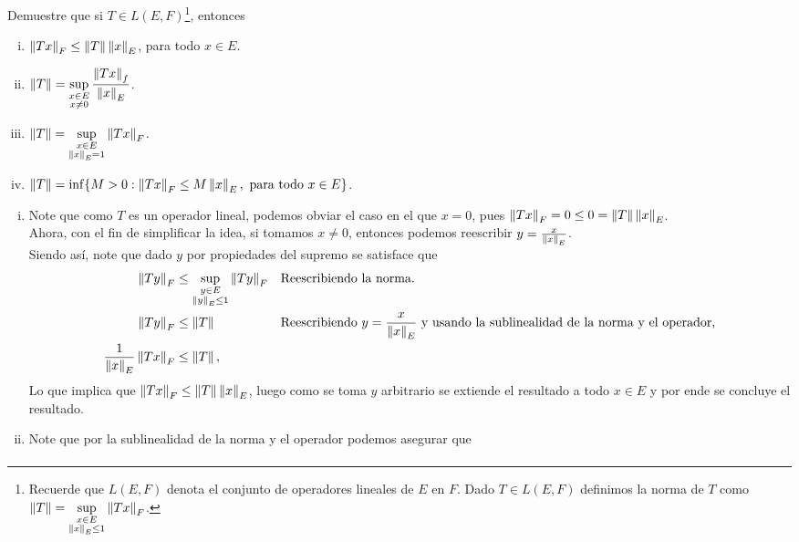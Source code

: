 \begin{homeworkProblem}
  Demuestre que si $T\in L(E,F)$\footnote{Recuerde que $L(E,F)$ denota el conjunto de operadores lineales de $E$ en $F$. Dado $T\in L(E,F)$ definimos la norma de $T$ como $\displaystyle \left\|T\right\| = \sup_{\substack{x \in E \\ \left\|x\right\|_E \leq 1}} \left\|Tx\right\|_F$.}, entonces
  \begin{enumerate}[(i)]
    \item $\left\|Tx\right\|_{F}\leq \left\|T\right\|\left\|x\right\|_{E}$, para todo $x\in E$.
    \item $\displaystyle \left\|T\right\| = \sup_{\substack{x \in E \\ x\neq 0}} \frac{\left\|Tx\right\|_{f}}{\left\|x\right\|_{E}}$.
    \item $\displaystyle \left\|T\right\| = \sup_{\substack{x \in E \\ \left\|x\right\|_E = 1}} \left\|Tx\right\|_F$.
    \item $\left\|T\right\|=\inf\{M>0:\left\|Tx\right\|_{F}\leq M\left\|x\right\|_{E}, \text{ para todo }x\in E\}$.
  \end{enumerate}
  \begin{solution}
    \begin{enumerate}[(i)]
      \item Note que como $T$ es un operador lineal, podemos obviar el caso en el que $x=0$, pues $\left\|Tx\right\|_{F}=0\leq 0=\left\|T\right\|\left\|x\right\|_{E}$.\\
        Ahora, con el fin de simplificar la idea, si tomamos $x\neq 0$, entonces podemos reescribir $y=\frac{x}{\left\|x\right\|_{E}}$.\\
        Siendo así, note que dado $y$ por propiedades del supremo se satisface que
        \begin{align*}
          \left\|Ty\right\|_{F}&\leq \sup_{\substack{y\in E\\ \left\|y\right\|_{E}\leq 1}}\left\|Ty\right\|_{F} &&\text{Reescribiendo la norma.}\\
          \left\|Ty\right\|_{F}&\leq \left\|T\right\| &&\text{Reescribiendo $y=\frac{x}{\left\|x\right\|_{E}}$ y usando la sublinealidad de la norma y el operador,}\\
          \frac{1}{\left\|x\right\|_{E}}\left\|Tx\right\|_{F}&\leq \left\|T\right\|,
        \end{align*}
        Lo que implica que $\left\|Tx\right\|_{F}\leq \left\|T\right\|\left\|x\right\|_{E}$, luego como se toma $y$ arbitrario se extiende el resultado a todo $x\in E$ y por ende se concluye el resultado.
      \item Note que por la sublinealidad de la norma y el operador podemos asegurar que
        \begin{align*}

\end{align*}
\end{enumerate}
\end{solution}
\end{homeworkProblem}
